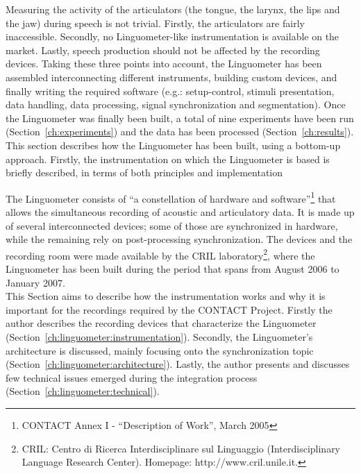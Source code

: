 Measuring the activity of the articulators (the tongue, the larynx, the lips and
the jaw) during speech is not trivial. 
Firstly, the articulators are fairly inaccessible.
Secondly, no Linguometer-like instrumentation is available on the market.
Lastly, speech production should not be affected by the recording devices.
Taking these three points into account, the Linguometer has been assembled 
interconnecting different instruments, building custom devices, and finally
writing the required software (e.g.: setup-control, stimuli presentation, data
handling, data processing, signal synchronization and segmentation).
Once the Linguometer was finally been built, a total of nine
experiments have been run (Section~\ref{ch:experiments}) and the data has been
processed (Section~\ref{ch:results}).\\

This section describes how the Linguometer has been built, using a bottom-up
approach. 
Firstly, the instrumentation on which the Linguometer is based is briefly
described, in terms of both principles and implementation

The Linguometer consists of ``a constellation of hardware and
software''\footnote{CONTACT Annex I - ``Description of Work'',
March 2005} that allows the simultaneous recording of acoustic and articulatory
data.
It is made up of several interconnected devices; some of those are 
synchronized in hardware, while the remaining rely on post-processing
synchronization.
The devices and the recording room were made available by the CRIL 
laboratory\footnote{CRIL: Centro di Ricerca Interdisciplinare sul Linguaggio 
(Interdisciplinary Language Research Center).
Homepage: http://www.cril.unile.it.},
where the Linguometer has been built during the period that spans
from August 2006 to January 2007.\\
This Section aims to describe how the instrumentation works and why it is
important for the recordings required by the CONTACT Project.
Firstly the author describes the recording devices that characterize the
Linguometer (Section~\ref{ch:linguometer:instrumentation}).
Secondly, the Linguometer's architecture is discussed, mainly focusing onto the
synchronization topic (Section~\ref{ch:linguometer:architecture}).
Lastly, the author presents and discusses few technical issues emerged during
the integration process (Section~\ref{ch:linguometer:technical}).
